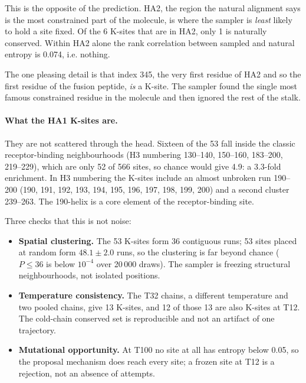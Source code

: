 \documentclass[11pt,a4paper]{article}
\begin{document}
\noindent
This is the opposite of the prediction. HA2, the region the natural alignment
says is the most constrained part of the molecule, is where the sampler is
\emph{least} likely to hold a site fixed. Of the 6 K-sites that are in HA2,
only 1 is naturally conserved. Within HA2 alone the rank correlation between
sampled and natural entropy is 0.074, i.e. nothing.

The one pleasing detail is that index 345, the very first residue of HA2 and so
the first residue of the fusion peptide, \emph{is} a K-site. The sampler found
the single most famous constrained residue in the molecule and then ignored the
rest of the stalk.

\paragraph{What the HA1 K-sites are.}
They are not scattered through the head. Sixteen of the 53 fall inside the
classic receptor-binding neighbourhoods (H3 numbering 130--140, 150--160,
183--200, 219--229), which are only 52 of 566 sites, so chance would give 4.9:
a 3.3-fold enrichment. In H3 numbering the K-sites include an almost unbroken
run 190--200 (190, 191, 192, 193, 194, 195, 196, 197, 198, 199, 200) and a
second cluster 239--263. The 190-helix is a core element of the receptor-binding
site.

Three checks that this is not noise:
\begin{itemize}
  \item \textbf{Spatial clustering.} The 53 K-sites form 36 contiguous runs; 53
    sites placed at random form $48.1 \pm 2.0$ runs, so the clustering is far
    beyond chance ($P \le 36$ is below $10^{-4}$ over 20\,000 draws). The
    sampler is freezing structural neighbourhoods, not isolated positions.
  \item \textbf{Temperature consistency.} The T32 chains, a different
    temperature and two pooled chains, give 13 K-sites, and 12 of those 13 are
    also K-sites at T12. The cold-chain conserved set is reproducible and not an
    artifact of one trajectory.
  \item \textbf{Mutational opportunity.} At T100 no site at all has entropy
    below 0.05, so the proposal mechanism does reach every site; a frozen site
    at T12 is a rejection, not an absence of attempts.
\end{itemize}
\end{document}
